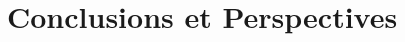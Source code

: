 \documentclass[11pt, oneside]{JeremyThesis}
\begin{document}
% 

% 

% 

% 

% 

\chapter*{Conclusions et Perspectives}








% 
\end{document}
